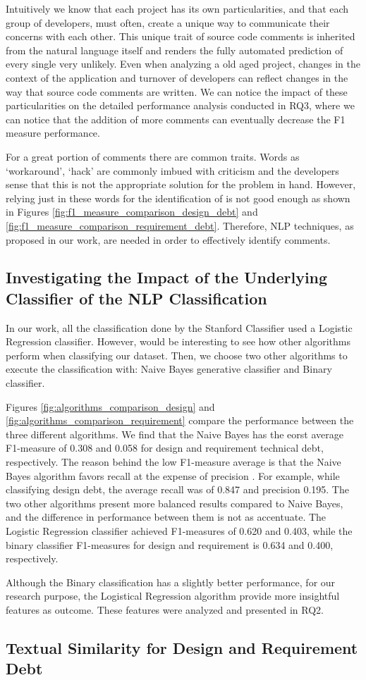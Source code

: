 
 Intuitively we know that each project has its own particularities, and that each group of developers, must often, create a unique way to communicate their concerns with each other. This unique trait of source code comments is inherited from the natural language itself and renders the fully automated prediction of every single \SATD very unlikely. Even when analyzing a old aged project, changes in the context of the application and turnover of developers can reflect changes in the way that source code comments are written. We can notice the impact of these particularities on the detailed performance analysis conducted in RQ3, where we can notice that the addition of more comments can eventually decrease the F1 measure performance.


For a great portion of \SATD comments there are common traits. Words as `workaround', `hack' are commonly imbued with criticism and the developers sense that this is not the appropriate solution for the problem in hand. However, relying just in these words for the identification of \SATD is not good enough as shown in Figures \ref{fig:f1_measure_comparison_design_debt} and \ref{fig:f1_measure_comparison_requirement_debt}. Therefore, NLP techniques, as proposed in our work, are needed in order to effectively identify \SATD comments.

\subsection{Investigating the Impact of the Underlying Classifier of the NLP Classification}

In our work, all the classification done by the Stanford Classifier used a Logistic Regression classifier. However, would be interesting to see how other  algorithms perform when classifying our dataset. Then, we choose two other algorithms to execute the classification with: Naive Bayes generative classifier and Binary classifier.

Figures \ref{fig:algorithms_comparison_design} and \ref{fig:algorithms_comparison_requirement} compare the performance between the three different algorithms. We find that the Naive Bayes has the eorst average F1-measure of 0.308 and 0.058 for design and requirement technical debt, respectively. The reason behind the low F1-measure average is that the Naive Bayes algorithm favors recall at the expense of precision . For example, while classifying design debt, the average recall was of 0.847 and precision 0.195. The two other algorithms present more balanced results compared to Naive Bayes, and the difference in performance between them is not as accentuate. The Logistic Regression classifier achieved F1-measures of 0.620 and 0.403, while the binary classifier F1-measures for design and requirement \SATD is 0.634 and 0.400, respectively. 

Although the Binary classification has a slightly better performance, for our research purpose, the Logistical Regression algorithm provide more insightful features as outcome. These features were analyzed and presented in RQ2. 

\subsection{Textual Similarity for Design and Requirement Debt}